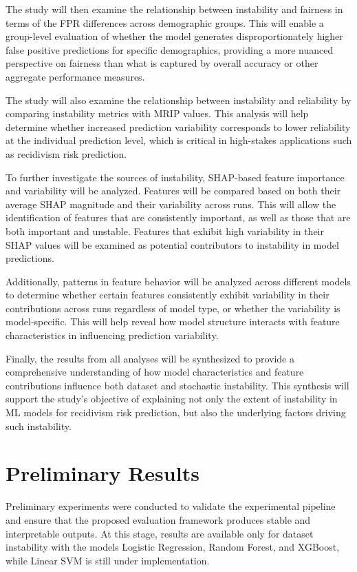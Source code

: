 \documentclass[12pt]{article}
\begin{document}
\begin{enumerate}
  The study will then examine the relationship between instability and fairness in terms of the FPR differences across demographic groups. This will enable a group-level evaluation of whether the model generates disproportionately higher false positive predictions for specific demographics, providing a more nuanced perspective on fairness than what is captured by overall accuracy or other aggregate performance measures.

  The study will also examine the relationship between instability and reliability by comparing instability metrics with MRIP values. This analysis will help determine whether increased prediction variability corresponds to lower reliability at the individual prediction level, which is critical in high-stakes applications such as recidivism risk prediction.

  To further investigate the sources of instability, SHAP-based feature importance and variability will be analyzed. Features will be compared based on both their average SHAP magnitude and their variability across runs. This will allow the identification of features that are consistently important, as well as those that are both important and unstable. Features that exhibit high variability in their SHAP values will be examined as potential contributors to instability in model predictions.

  Additionally, patterns in feature behavior will be analyzed across different models to determine whether certain features consistently exhibit variability in their contributions across runs regardless of model type, or whether the variability is model-specific. This will help reveal how model structure interacts with feature characteristics in influencing prediction variability.

  Finally, the results from all analyses will be synthesized to provide a comprehensive understanding of how model characteristics and feature contributions influence both dataset and stochastic instability. This synthesis will support the study's objective of explaining not only the extent of instability in ML models for recidivism risk prediction, but also the underlying factors driving such instability.
\end{enumerate}
\newpage

\section{Preliminary Results}
Preliminary experiments were conducted to validate the experimental pipeline and ensure that the proposed evaluation framework produces stable and interpretable outputs. At this stage, results are available only for dataset instability with the models Logistic Regression, Random Forest, and XGBoost, while Linear SVM is still under implementation. \\
\end{document}
